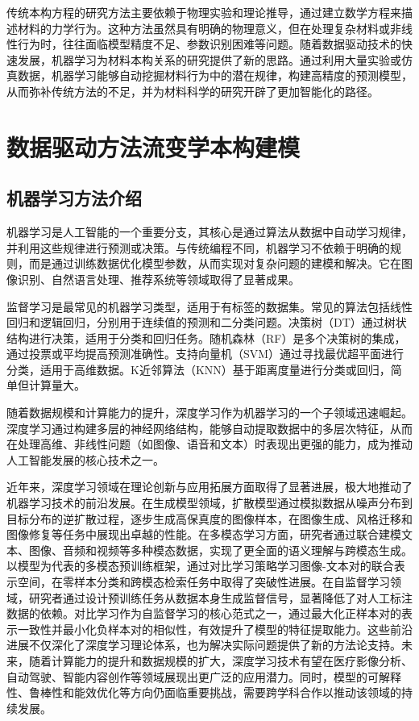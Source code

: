 传统本构方程的研究方法主要依赖于物理实验和理论推导，通过建立数学方程来描述材料的力学行为。这种方法虽然具有明确的物理意义，但在处理复杂材料或非线性行为时，往往面临模型精度不足、参数识别困难等问题\cite{amamotoDatadrivenApproachesStructureproperty2022}。随着数据驱动技术的快速发展，机器学习为材料本构关系的研究提供了新的思路。通过利用大量实验或仿真数据，机器学习能够自动挖掘材料行为中的潜在规律，构建高精度的预测模型，从而弥补传统方法的不足，并为材料科学的研究开辟了更加智能化的路径。
\section{数据驱动方法流变学本构建模}
\subsection{机器学习方法介绍}
机器学习是人工智能的一个重要分支，其核心是通过算法从数据中自动学习规律，并利用这些规律进行预测或决策。与传统编程不同，机器学习不依赖于明确的规则，而是通过训练数据优化模型参数，从而实现对复杂问题的建模和解决。它在图像识别、自然语言处理、推荐系统等领域取得了显著成果\cite{wang2023scientific}。

监督学习是最常见的机器学习类型，适用于有标签的数据集。常见的算法包括线性回归和逻辑回归，分别用于连续值的预测和二分类问题\cite{uesaka1973theory,liu2021self}。决策树（DT）通过树状结构进行决策，适用于分类和回归任务\cite{quinlan1986induction}。随机森林（RF）是多个决策树的集成，通过投票或平均提高预测准确性\cite{breiman2001random}。支持向量机（SVM）通过寻找最优超平面进行分类，适用于高维数据\cite{cortes1995support}。K近邻算法（KNN）基于距离度量进行分类或回归，简单但计算量大\cite{cover1967nearest}。

随着数据规模和计算能力的提升，深度学习作为机器学习的一个子领域迅速崛起。深度学习通过构建多层的神经网络结构，能够自动提取数据中的多层次特征，从而在处理高维、非线性问题（如图像、语音和文本）时表现出更强的能力，成为推动人工智能发展的核心技术之一\cite{wang2023scientific}。

近年来，深度学习领域在理论创新与应用拓展方面取得了显著进展，极大地推动了机器学习技术的前沿发展。在生成模型领域，扩散模型通过模拟数据从噪声分布到目标分布的逆扩散过程，逐步生成高保真度的图像样本，在图像生成、风格迁移和图像修复等任务中展现出卓越的性能\cite{yang2023diffusion}。在多模态学习方面，研究者通过联合建模文本、图像、音频和视频等多种模态数据，实现了更全面的语义理解与跨模态生成。以模型为代表的多模态预训练框架，通过对比学习策略学习图像-文本对的联合表示空间，在零样本分类和跨模态检索任务中取得了突破性进展\cite{xu2023multimodal}。在自监督学习领域，研究者通过设计预训练任务从数据本身生成监督信号，显著降低了对人工标注数据的依赖\cite{Xie2023}。对比学习作为自监督学习的核心范式之一，通过最大化正样本对的表示一致性并最小化负样本对的相似性，有效提升了模型的特征提取能力\cite{Zhu2024Vision}。这些前沿进展不仅深化了深度学习理论体系，也为解决实际问题提供了新的方法论支持。未来，随着计算能力的提升和数据规模的扩大，深度学习技术有望在医疗影像分析、自动驾驶、智能内容创作等领域展现出更广泛的应用潜力。同时，模型的可解释性、鲁棒性和能效优化等方向仍面临重要挑战，需要跨学科合作以推动该领域的持续发展\cite{wang2023scientific}。

